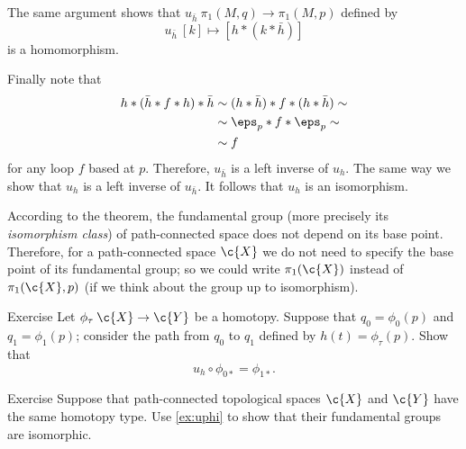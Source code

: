 The same argument shows that $u_{\bar h}\: \pi_1(M,q)\to \pi_1(M,p)$ defined by 
\[u_{\bar h}\:[k]\mapsto [h*(k*\bar h)]\]
is a homomorphism.

Finally note that 
\begin{align*}
h*(\bar h*f*h)*\bar h&\sim (h*\bar h)*f*(h*\bar h)\sim
\\
&\sim \eps_p*f*\eps_p\sim
\\
&\sim f
\end{align*}
for any loop $f$ based at $p$.
Therefore, $u_{\bar h}$ is a left inverse of $u_h$.
The same way we show that $u_{h}$ is a left inverse of $u_{\bar h}$.
It follows that $u_h$ is an isomorphism.
\qeds

According to the theorem, the fundamental group (more precisely its \textit{isomorphism class}) of path-connected space does not depend on its base point.
Therefore, for a path-connected space $\c{X}$ we do not need to specify the base point of its fundamental group; so we could write $\pi_1(\c{X})$ instead of $\pi_1(\c{X},p)$ (if we think about the group up to isomorphism).

\begin{thm}{Exercise}\label{ex:uphi}
Let $\phi_\tau\:\c{X}\to\c{Y}$ be a homotopy.
Suppose that $q_0=\phi_0(p)$ and $q_1=\phi_1(p)$; 
consider the path from $q_0$ to $q_1$ defined by $h(t)=\phi_\tau(p)$.
Show that 
\[u_h\circ \phi_{0*}=\phi_{1*}.\]
\end{thm}

\begin{thm}{Exercise}
Suppose that path-connected topological spaces $\c{X}$ and $\c{Y}$ have the same homotopy type.
Use \ref{ex:uphi} to show that their fundamental groups are isomorphic.
\end{thm}




